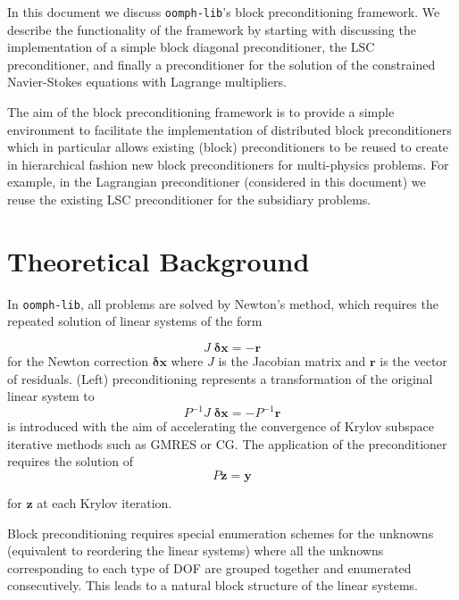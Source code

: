 In this document we discuss \verb+oomph-lib+'s block preconditioning
framework. We describe the functionality of the framework by starting with 
discussing the implementation of a simple block diagonal preconditioner, the 
LSC preconditioner, and finally a preconditioner for the 
solution of the constrained Navier-Stokes equations with Lagrange multipliers.

The aim of the block preconditioning framework is to provide a simple 
environment to facilitate the implementation of distributed block 
preconditioners which in particular allows existing (block) preconditioners to 
be reused to create in hierarchical fashion new block preconditioners for 
multi-physics problems. For example, in the Lagrangian preconditioner 
(considered in this document) we reuse the existing LSC preconditioner 
for the subsidiary problems.

\section{ Theoretical Background\label{sec:theoretical_background}}
In \verb+oomph-lib+, all problems are solved by Newton's method,
which requires the repeated solution of linear systems of the form

\begin{equation*}
J\;\mathbf{\delta x} = -\mathbf{r}
\end{equation*}
for the Newton correction $\mathbf{\delta x}$ where $J$ is the
Jacobian matrix and $\mathbf{r}$ is the vector of residuals. (Left) 
preconditioning represents a transformation of the original linear system to
\begin{equation*}
P^{-1}J\;\mathbf{ \delta x}=-P^{-1}\mathbf{r}
\end{equation*}
is introduced with the aim of accelerating the convergence of Krylov subspace 
iterative methods such as GMRES or CG. The application of the preconditioner 
requires the solution of
\begin{equation*}
P\mathbf{z}=\mathbf{y}
\end{equation*}

for $\mathbf{z}$ at each Krylov iteration.

Block preconditioning requires special enumeration schemes for the unknowns 
(equivalent to reordering the linear systems) where all the unknowns 
corresponding to each type of DOF are grouped together and enumerated 
consecutively. This leads to a natural block structure of the linear systems.

